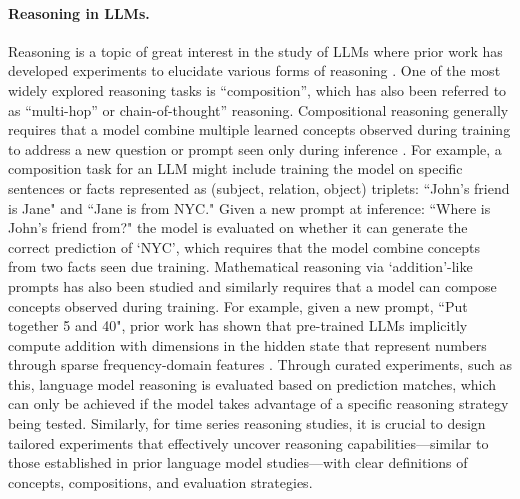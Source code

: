 \paragraph{Reasoning in LLMs.} Reasoning is a topic of great interest in the study of LLMs where prior work has developed experiments to elucidate various forms of reasoning \citep{allenshu2023physics3.2, allenzhu2023physics3.1, wang2024grokked, soheeyang2024multihopreasoning, zhong2023mquake}. One of the most widely explored reasoning tasks is ``composition'', which has also been referred to as ``multi-hop'' or chain-of-thought'' reasoning. Compositional reasoning generally requires that a model combine multiple learned concepts observed during training to address a new question or prompt seen only during inference \citep{wang2024grokked, soheeyang2024multihopreasoning, zhong2023mquake}. For example, a composition task for an LLM might include training the model on specific sentences or facts represented as (subject, relation, object) triplets: ``John's friend is Jane" and ``Jane is from NYC." Given a new prompt at inference: ``Where is John's friend from?" the model is evaluated on whether it can generate the correct prediction of `NYC', which requires that the model combine concepts from two facts seen due training. Mathematical reasoning via `addition'-like prompts has also been studied and similarly requires that a model can compose concepts observed during training. For example, given a new prompt, ``Put together 5 and 40", prior work has shown that pre-trained LLMs implicitly compute addition with dimensions in the hidden state that represent numbers through sparse frequency-domain features \citep{zhou2024llmfourieraddition}. Through curated experiments, such as this, language model reasoning is evaluated based on prediction matches, which can only be achieved if the model takes advantage of a specific reasoning strategy being tested. Similarly, for time series reasoning studies, it is crucial to design tailored experiments that effectively uncover reasoning capabilities—similar to those established in prior language model studies—with clear definitions of concepts, compositions, and evaluation strategies.


